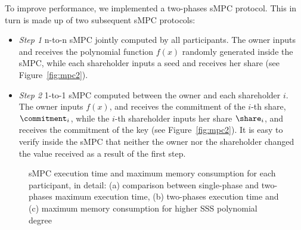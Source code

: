 To improve performance, we implemented a two-phases sMPC protocol. 
This in turn is made up of two subsequent sMPC protocols:
\begin{itemize}
	\item {\em Step 1} n-to-n sMPC jointly computed by all participants. The owner inputs \key and receives the polynomial function $f\left( x \right)$ randomly generated inside the sMPC, while each shareholder inputs a seed and receives her share (see Figure~\ref{fig:mpc2}). 
	\item {\em Step 2} 1-to-1 sMPC computed between the owner and each shareholder $i$. The owner inputs $f\left( x \right)$, and receives the commitment of the $i$-th share, $\commitment_i$, while the $i$-th shareholder inputs her share $\share_{i}$, and receives the commitment of the key (see Figure~\ref{fig:mpc2}). It is easy to verify inside the sMPC that neither the owner nor the shareholder changed the value received as a result of the first step.
\end{itemize}


\begin{figure}[t]
	\centering
	\hfill
	\hfill
	\caption{sMPC execution time and maximum memory consumption for each participant, in detail: (a) comparison between single-phase and two-phases maximum execution time, (b) two-phases execution time and (c) maximum memory consumption for higher SSS polynomial degree}
	\label{fig:timecomp}
\end{figure}



